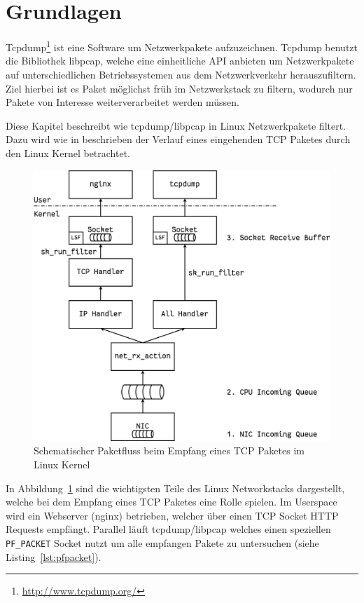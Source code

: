 \section{Grundlagen}
\label{sec:grundlagen}

Tcpdump\footnote{\url{http://www.tcpdump.org/}} ist eine Software um
Netzwerkpakete aufzuzeichnen. Tcpdump benutzt die Bibliothek libpcap, welche
eine einheitliche API anbieten um Netzwerkpakete auf unterschiedlichen
Betriebssystemen aus dem Netzwerkverkehr herauszufiltern. Ziel hierbei ist es
Paket möglichst früh im Netzwerkstack zu filtern, wodurch nur Pakete
von Interesse weiterverarbeitet werden müssen.

Diese Kapitel beschreibt wie tcpdump/libpcap in Linux Netzwerkpakete filtert.
Dazu wird wie in
\cite{Insolvibile:2001:KKL,Insolvibile:2002:KKIa,Insolvibile:2002:KKIb}
beschrieben der Verlauf eines eingehenden TCP Paketes durch den Linux Kernel
betrachtet.


\begin{figure} \centering
\includegraphics[width=.7\textwidth]{images/network-stack.eps}
\caption{Schematischer Paketfluss beim Empfang eines TCP Paketes im Linux
Kernel}\label{fig:network-stack}
\end{figure}

In Abbildung~\ref{fig:network-stack} sind die wichtigsten Teile des Linux
Networkstacks dargestellt, welche bei dem Empfang eines TCP Paketes eine Rolle
spielen. Im Userspace wird ein Webserver (nginx) betrieben, welcher über einen
TCP Socket HTTP Requests empfängt. Parallel läuft tcpdump/libpcap welches einen
speziellen \texttt{PF\_PACKET} Socket nutzt um alle empfangen Pakete zu
untersuchen (siehe Listing~\ref{lst:pfpacket}).

